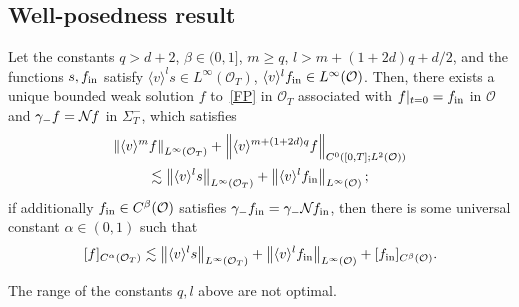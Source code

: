 \documentclass[AHL,Unicode,longabstracts,published]{cedram}
\newcommand*\fin {f_{\rm in}}
\newcommand*\NN {{\mathcal{N}\hspace{-.3mm}}}
\newcommand*\OO {\mathcal{O}}
\newcommand{\lv}{\langle v\rangle}
\begin{document}
\subsection{Well-posedness result}

\begin{prop}\label{globalr}
Let the constants $q>d+2$, $\beta\in(0,1]$, $m\ge q$, $l>m+(1+2d)q+d/2$, and the functions $s,\fin$ satisfy $\lv^ls\in L^\infty(\OO_T)$, $\lv^l\fin\in L^\infty(\OO)$. Then, there exists a unique bounded weak solution $f$ to~\eqref{FP} in $\OO_T$ associated with $f|_{t=0}=\fin$ in $\OO$ and $\gamma_-f=\NN f$ in $\Sigma_T^-$, which satisfies
\begin{multline}\label{bddgr}
\left\|\lv^mf\right\|_{L^\infty(\OO_T)} +\left\|\lv^{m+(1+2d)q} f\right\|_{C^0\left([0,T];L^2(\OO)\right)}\\
\lesssim \left\|\lv^ls\right\|_{L^\infty(\OO_T)} + \left\|\lv^l\fin\right\|_{L^\infty(\OO)} ;
\end{multline}
if additionally $\fin\in C^\beta(\OO)$ satisfies $\gamma_-\fin=\gamma_-\NN\fin$, then there is some universal constant $\alpha\in(0,1)$ such that
\begin{equation}\label{holdergr}
[f]_{C^\alpha(\OO_T)}
\lesssim \left\|\lv^ls\right\|_{L^\infty(\OO_T)} + \left\|\lv^l\fin\right\|_{L^\infty(\OO)} +[\fin]_{C^\beta(\OO)}.
\end{equation}
\end{prop}

\begin{rema}
The range of the constants $q,l$ above are not optimal.
\end{rema}
\end{document}

